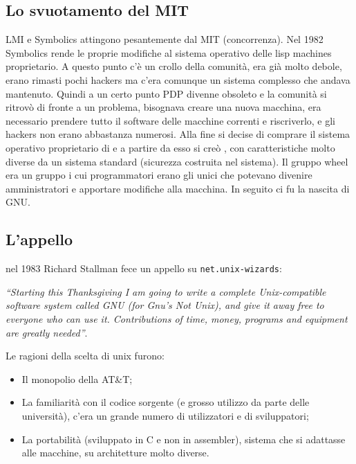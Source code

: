 \subsection{Lo svuotamento del MIT}

LMI e Symbolics attingono pesantemente dal MIT (concorrenza). Nel 1982 Symbolics rende le proprie modifiche al sistema operativo delle lisp machines proprietario. A questo punto c'è un crollo della comunità, era già molto debole, erano rimasti pochi hackers ma c'era comunque un sistema complesso che andava mantenuto. 
Quindi a un certo punto PDP divenne obsoleto e la comunità si ritrovò di fronte a un problema, bisognava creare una nuova macchina, era necessario prendere tutto il software delle macchine correnti e riscriverlo, e gli hackers non erano abbastanza numerosi. Alla fine si decise di comprare il sistema operativo proprietario di  e a partire da esso si creò , con caratteristiche molto diverse da un sistema standard (sicurezza costruita nel sistema). 
Il gruppo wheel era un gruppo i cui programmatori erano gli unici che potevano divenire amministratori e apportare modifiche alla macchina. In seguito ci fu la nascita di GNU.

\subsection{L'appello}

nel 1983 Richard Stallman fece un appello su \texttt{net.unix-wizards}:

\begin{center}

\textit{``Starting this Thanksgiving I am going to write a complete Unix-compatible software system called GNU (for Gnu’s Not Unix), and give it away free to everyone who can use it. Contributions of time, money, programs and equipment are greatly needed''}.

\end{center}

Le ragioni della scelta di unix furono:

\begin{itemize}

\item Il monopolio della AT\&T;
\item La familiarità con il codice sorgente (e grosso utilizzo da parte delle università), c'era un grande numero di utilizzatori e di sviluppatori;
\item La portabilità (sviluppato in C e non in assembler), sistema che si adattasse alle macchine, su architetture molto diverse.

\end{itemize}

